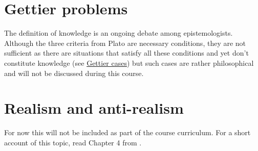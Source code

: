 \documentclass[
]{book}
\begin{document}
\hypertarget{gettier-problems}{%
\section{Gettier problems}\label{gettier-problems}}

The definition of knowledge is an ongoing debate among epistemologists. Although the three criteria from Plato are necessary conditions, they are not sufficient as there are situations that satisfy all these conditions and yet don't constitute knowledge (see \href{https://en.wikipedia.org/wiki/Gettier_case}{Gettier cases}) but such cases are rather philosophical and will not be discussed during this course.

\hypertarget{realism}{%
\section{Realism and anti-realism}\label{realism}}

For now this will not be included as part of the course curriculum. For a short account of this topic, read Chapter 4 from \citep{okasha-pos}.

  
\end{document}
